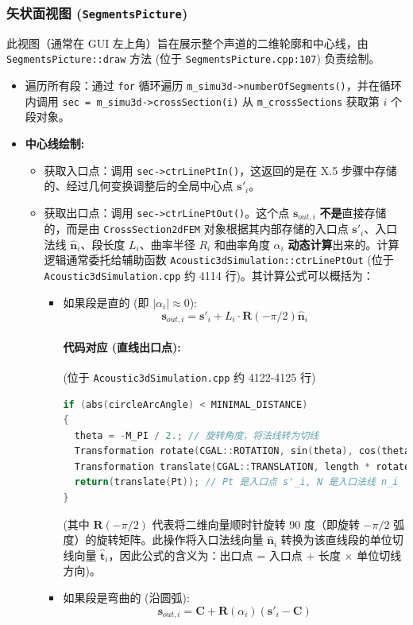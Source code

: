 \documentclass{ctexart}
\begin{document}
\subsubsection{矢状面视图 (\texttt{SegmentsPicture})}
此视图（通常在 GUI 左上角）旨在展示整个声道的二维轮廓和中心线，由 \texttt{SegmentsPicture::draw} 方法 (位于 \texttt{SegmentsPicture.cpp:107}) 负责绘制。
\begin{itemize}
    \item 遍历所有段：通过 \texttt{for} 循环遍历 \texttt{m\_simu3d->numberOfSegments()}，并在循环内调用 \texttt{sec = m\_simu3d->crossSection(i)} 从 \texttt{m\_crossSections} 获取第 \(i\) 个段对象。
    \item \textbf{中心线绘制:} 
        \begin{itemize}
            \item 获取入口点：调用 \texttt{sec->ctrLinePtIn()}，这返回的是在 X.5 步骤中存储的、经过几何变换调整后的全局中心点 \({\mathbf{s}'}_i\)。
            \item 获取出口点：调用 \texttt{sec->ctrLinePtOut()}。这个点 \(\mathbf{s}_{out,i}\) \textbf{不是}直接存储的，而是由 \texttt{CrossSection2dFEM} 对象根据其内部存储的入口点 \({\mathbf{s}'}_i\)、入口法线 \(\hat{\mathbf{n}}_i\)、段长度 \(L_i\)、曲率半径 \(R_i\) 和曲率角度 \(\alpha_i\) \textbf{动态计算}出来的。计算逻辑通常委托给辅助函数 \texttt{Acoustic3dSimulation::ctrLinePtOut} (位于 \texttt{Acoustic3dSimulation.cpp} 约 4114 行)。其计算公式可以概括为：
                \begin{itemize}
                    \item 如果段是直的 (即 \(|\alpha_i| \approx 0\)):
                    \[ \mathbf{s}_{out,i} = {\mathbf{s}'}_i + L_i \cdot \mathbf{R}(-\pi/2) \hat{\mathbf{n}}_i \]
                    \paragraph{代码对应 (直线出口点):} (位于 \texttt{Acoustic3dSimulation.cpp} 约 4122-4125 行)
                    \begin{lstlisting}[language=C++]
if (abs(circleArcAngle) < MINIMAL_DISTANCE)
{
  theta = -M_PI / 2.; // 旋转角度，将法线转为切线
  Transformation rotate(CGAL::ROTATION, sin(theta), cos(theta));
  Transformation translate(CGAL::TRANSLATION, length * rotate(N)); // 沿切线平移 length
  return(translate(Pt)); // Pt 是入口点 s'_i, N 是入口法线 n_i
}
                    \end{lstlisting}
                    (其中 \(\mathbf{R}(-\pi/2)\) 代表将二维向量顺时针旋转 90 度（即旋转 \(-\pi/2\) 弧度）的旋转矩阵。此操作将入口法线向量 \(\hat{\mathbf{n}}_i\) 转换为该直线段的单位切线向量 \(\hat{\mathbf{t}}_i\)，因此公式的含义为：出口点 = 入口点 + 长度 \(\times\) 单位切线方向)。
                    \item 如果段是弯曲的 (沿圆弧):
                    \[ \mathbf{s}_{out,i} = \mathbf{C} + \mathbf{R}(\alpha_i) ({\mathbf{s}'}_i - \mathbf{C}) \]

\end{itemize}
\end{itemize}
\end{itemize}
\end{document}
